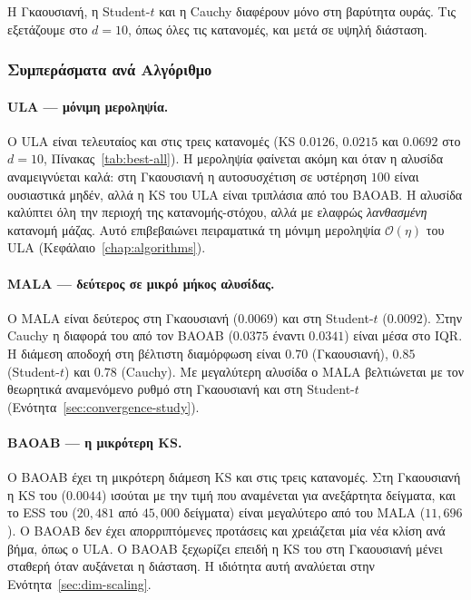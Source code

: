 Η Γκαουσιανή, η Student-$t$ και η Cauchy διαφέρουν μόνο στη βαρύτητα ουράς. Τις
εξετάζουμε στο $d=10$, όπως όλες τις κατανομές, και μετά σε υψηλή διάσταση.

\subsubsection{Συμπεράσματα ανά Αλγόριθμο}
\label{sec:verdict}

\paragraph{ULA --- μόνιμη μεροληψία.}
Ο ULA είναι τελευταίος και στις τρεις κατανομές (KS $0.0126$, $0.0215$ και $0.0692$
στο $d=10$, Πίνακας~\ref{tab:best-all}). Η μεροληψία φαίνεται ακόμη και όταν η αλυσίδα
αναμειγνύεται καλά: στη Γκαουσιανή η αυτοσυσχέτιση σε υστέρηση $100$ είναι ουσιαστικά
μηδέν, αλλά η KS του ULA είναι τριπλάσια από του BAOAB. Η αλυσίδα καλύπτει όλη την
περιοχή της κατανομής-στόχου, αλλά με ελαφρώς \emph{λανθασμένη} κατανομή μάζας. Αυτό
επιβεβαιώνει πειραματικά τη μόνιμη μεροληψία $\mathcal{O}(\eta)$ του ULA
(Κεφάλαιο~\ref{chap:algorithms}).

\paragraph{MALA --- δεύτερος σε μικρό μήκος αλυσίδας.}
Ο MALA είναι δεύτερος στη Γκαουσιανή ($0.0069$) και στη Student-$t$ ($0.0092$). Στην
Cauchy η διαφορά του από τον BAOAB ($0.0375$ έναντι $0.0341$) είναι μέσα στο IQR. Η
διάμεση αποδοχή στη βέλτιστη διαμόρφωση είναι $0.70$ (Γκαουσιανή), $0.85$
(Student-$t$) και $0.78$ (Cauchy). Με μεγαλύτερη αλυσίδα ο MALA βελτιώνεται με τον
θεωρητικά αναμενόμενο ρυθμό στη Γκαουσιανή και στη Student-$t$ (Ενότητα~\ref{sec:convergence-study}).

\paragraph{BAOAB --- η μικρότερη KS.}
Ο BAOAB έχει τη μικρότερη διάμεση KS και στις τρεις κατανομές. Στη Γκαουσιανή η KS
του ($0.0044$) ισούται με την τιμή που αναμένεται για ανεξάρτητα δείγματα, και το ESS του ($20{,}481$
από $45{,}000$ δείγματα) είναι μεγαλύτερο από του MALA ($11{,}696$). Ο BAOAB δεν έχει
απορριπτόμενες προτάσεις και χρειάζεται μία νέα κλίση ανά βήμα, όπως ο ULA. Ο
BAOAB ξεχωρίζει επειδή η KS του στη Γκαουσιανή μένει σταθερή όταν αυξάνεται η
διάσταση. Η ιδιότητα αυτή αναλύεται στην Ενότητα~\ref{sec:dim-scaling}.


